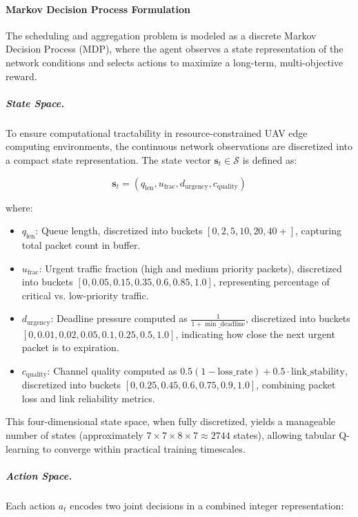 \documentclass[pdflatex,sn-mathphys-num]{sn-jnl}%
\theoremstyle{thmstyleone}%
\theoremstyle{thmstyletwo}%
\theoremstyle{thmstylethree}%
\begin{document}
\paragraph{Markov Decision Process Formulation}

The scheduling and aggregation problem is modeled as a discrete Markov Decision Process (MDP), where the agent observes a state representation of the network conditions and selects actions to maximize a long-term, multi-objective reward.

\subparagraph{State Space.}
To ensure computational tractability in resource-constrained UAV edge computing environments, the continuous network observations are discretized into a compact state representation. The state vector $\mathbf{s}_t \in \mathcal{S}$ is defined as:

\begin{equation}
\mathbf{s}_t = (q_\text{len}, u_\text{frac}, d_\text{urgency}, c_\text{quality})
\label{eq:state_compact}
\end{equation}

where:
\begin{itemize}
    \item $q_\text{len}$: Queue length, discretized into buckets $[0, 2, 5, 10, 20, 40+]$, capturing total packet count in buffer.
    \item $u_\text{frac}$: Urgent traffic fraction (high and medium priority packets), discretized into buckets $[0, 0.05, 0.15, 0.35, 0.6, 0.85, 1.0]$, representing percentage of critical vs. low-priority traffic.
    \item $d_\text{urgency}$: Deadline pressure computed as $\frac{1}{1 + \min\_\text{deadline}}$, discretized into buckets $[0, 0.01, 0.02, 0.05, 0.1, 0.25, 0.5, 1.0]$, indicating how close the next urgent packet is to expiration.
    \item $c_\text{quality}$: Channel quality computed as $0.5(1 - \text{loss\_rate}) + 0.5 \cdot \text{link\_stability}$, discretized into buckets $[0, 0.25, 0.45, 0.6, 0.75, 0.9, 1.0]$, combining packet loss and link reliability metrics.
\end{itemize}

This four-dimensional state space, when fully discretized, yields a manageable number of states (approximately $7 \times 7 \times 8 \times 7 \approx 2744$ states), allowing tabular Q-learning to converge within practical training timescales.

\subparagraph{Action Space.}
Each action $a_t$ encodes two joint decisions in a combined integer representation:
\end{document}

